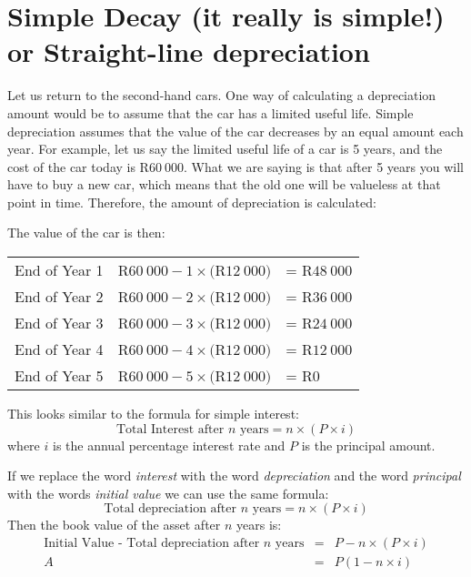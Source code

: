 
\section{Simple Decay (it really is simple!) or Straight-line depreciation}
Let us return to the second-hand cars. One way of calculating a depreciation amount would be to assume that the car has a limited useful life. Simple depreciation assumes that the value of the car decreases by an equal amount each year. For example, let us say the limited useful life of a car is 5 years, and the cost of the car today is R$60~000$. What we are saying is that after 5 years you will have to buy a new car, which means that the old one will be valueless at that point in time. Therefore, the amount of depreciation is calculated:

The value of the car is then:
\begin{center}
\begin{tabular}{ccl}
End of Year 1&R$60~000 - 1\times($R$12~000)$&= R$48~000$\\
End of Year 2&R$60~000 - 2\times($R$12~000)$&= R$36~000$\\
End of Year 3&R$60~000 - 3\times($R$12~000)$&= R$24~000$\\
End of Year 4&R$60~000 - 4\times($R$12~000)$&= R$12~000$\\
End of Year 5&R$60~000 - 5\times($R$12~000)$&= R$0$\\
\end{tabular}
\end{center}
This looks similar to the formula for simple interest:
\begin{equation*}
\mbox{Total Interest after $n$ years} = n \times (P \times i)
\end{equation*}
where $i$ is the annual percentage interest rate and $P$ is the principal amount.

If we replace the word \textit{interest} with the word \textit{depreciation} and the word \textit{principal} with the words \textit{initial value} we can use the same formula:
\begin{equation*}
\mbox{Total depreciation after $n$ years} = n \times (P \times i)
\end{equation*}
Then the book value of the asset after $n$ years is:
\begin{eqnarray*}
\mbox{Initial Value - Total depreciation after $n$ years} &=& P - n \times (P \times i)\\
A &=&P(1-n\times i)
\end{eqnarray*}

